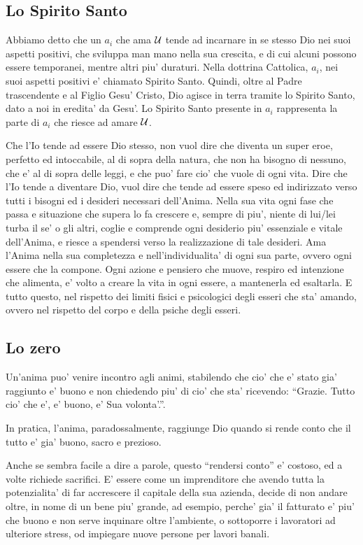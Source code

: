 \subsection{Lo Spirito Santo}

Abbiamo detto che un $a_i$ che ama $\mathcal{U}$ tende ad incarnare in se stesso Dio nei suoi aspetti positivi, che sviluppa man mano nella sua crescita, e di cui alcuni possono essere temporanei, mentre altri piu' duraturi. Nella dottrina Cattolica, $a_i$, nei suoi aspetti positivi e' chiamato Spirito Santo. Quindi, oltre al Padre trascendente e al Figlio Gesu' Cristo, Dio agisce in terra tramite lo Spirito Santo, dato a noi in eredita' da Gesu'. Lo Spirito Santo presente in $a_i$ rappresenta la parte di $a_i$ che riesce ad amare $\mathcal{U}$.

Che l'Io tende ad essere Dio stesso, non vuol dire che diventa un super eroe, perfetto ed intoccabile, al di sopra della natura, che non ha bisogno di nessuno, che e' al di sopra delle leggi, e che puo' fare cio' che vuole di ogni vita. 
Dire che l'Io tende a diventare Dio, vuol dire che tende ad essere speso ed indirizzato verso tutti i bisogni ed i desideri necessari dell'Anima. Nella sua vita ogni fase che passa e situazione che supera lo fa crescere e, sempre di piu', niente di lui/lei turba il se' o gli altri, coglie e comprende ogni desiderio piu' essenziale e vitale dell'Anima, e riesce a spendersi verso la realizzazione di tale desideri. Ama l'Anima nella sua completezza e nell'individualita' di ogni sua parte, ovvero ogni essere che la compone. Ogni azione e pensiero che muove, respiro ed intenzione che alimenta, e' volto a creare la vita in ogni essere, a mantenerla ed esaltarla. E tutto questo, nel rispetto dei limiti fisici e psicologici degli esseri che sta' amando, ovvero nel rispetto del corpo e della psiche degli esseri.


\subsection{Lo zero}
\label{loZero}
Un'anima puo' venire incontro agli animi, stabilendo che cio' che e' stato gia' raggiunto e' buono e non chiedendo piu' di cio' che sta' ricevendo: ``Grazie. Tutto cio' che e', e' buono, e' Sua volonta'.''.

In pratica, l'anima, paradossalmente, raggiunge Dio quando si rende conto che il tutto e' gia' buono, sacro e prezioso.

Anche se sembra facile a dire a parole, questo ``rendersi conto'' e' costoso, ed a volte richiede sacrifici. E' essere come un imprenditore che avendo tutta la potenzialita' di far accrescere il capitale della sua azienda, decide di non andare oltre, in nome di un bene piu' grande, ad esempio, perche' gia' il fatturato e' piu' che buono e non serve inquinare oltre l'ambiente, o sottoporre i lavoratori ad ulteriore stress, od impiegare nuove persone per lavori banali.

